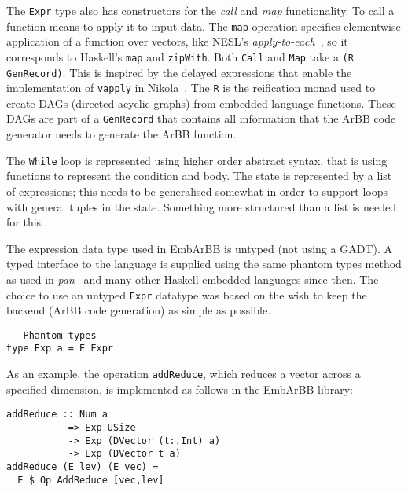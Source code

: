 The {\tt Expr} type also has constructors for the {\em call} and {\em map} 
functionality. To call a function means to apply it to input data. The 
{\tt map} operation specifies elementwise application of a function over 
vectors, like NESL's {\em apply-to-each}~\cite{NESL}, so it corresponds 
to Haskell's {\tt map} and {\tt zipWith}. Both {\tt Call} and {\tt Map} 
take a {\tt(R GenRecord)}. This is inspired by the delayed expressions 
that enable the implementation of {\tt vapply} in Nikola~\cite{NIKOLA}. 
The {\tt R} is the reification monad used to create DAGs (directed acyclic 
graphs) from embedded language functions. These DAGs are part of a 
{\tt GenRecord} that contains all information that the ArBB code generator 
needs to generate the ArBB function. 

The {\tt While} loop is represented using higher order abstract syntax, 
that is using functions to represent the condition and body. The state 
is represented by a list of expressions; this needs to be generalised 
somewhat in order to support loops with general tuples in the state. 
Something more structured than a list is needed for this. 

The expression data type used in EmbArBB is untyped (not using a GADT). 
A typed interface to the language is supplied using the same phantom types 
method as used in {\em pan}~\cite{COMPILEEDSL} and many other Haskell embedded 
languages since then. The choice to use an untyped {\tt Expr} datatype was 
based on the wish to keep the backend (ArBB code generation) as simple as 
possible. 


\begin{verbatim}
-- Phantom types
type Exp a = E Expr 
\end{verbatim}  

As an example, the operation {\tt addReduce}, which reduces a vector across a specified dimension, is implemented as follows in the EmbArBB library:

\begin{verbatim}
addReduce :: Num a 
           => Exp USize 
           -> Exp (DVector (t:.Int) a) 
           -> Exp (DVector t a) 
addReduce (E lev) (E vec) = 
  E $ Op AddReduce [vec,lev]
\end{verbatim}  

